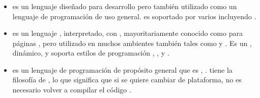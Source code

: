 	\subsubsection{\serverSideAS \scriptingLanguagePL}
		\begin{itemize}
			\item
				\textbf{\phpNAME} es un lenguaje \scripting \serverSideAS diseñado para desarrollo \webINT pero también utilizado como un lenguaje de programación de uso general\cite{online_technology_php}. \phpNAME es soportado por varios \webserverINT incluyendo \apacheNAME \httpNAME \serverAS.

			\item
				\textbf{\javaScriptNAME} es un lenguaje \lightweightPL, interpretado, \objectOrientedPL con \firstClassFuncPL, mayoritariamente conocido como \scriptingLanguagePL para páginas \webINT, pero utilizado en muchos ambientes \nonBrowserINT también tales como \nodejsNAME y \apacheNAME \couchdbNAME. Es un \scriptingLanguagePL \prototypeBasedPL, \multiParadigmPL dinámico, y soporta estilos de programación \objectOrientedPL, \imperativePL, y \functionalPL \cite{online_technology_mozilla_javascript}. 
			\item
				\textbf{\javaNAME} es un lenguaje de programación de propósito general que es \objectOrientedPL, \concurrentPL \classBasedPL \cite{online_technology_mozilla_javascript}. \javaNAME tiene la filosofía de \writeOnceRunAnyPL, lo que significa que si se quiere cambiar de plataforma, no es necesario volver a compilar el código \cite{online_java_write_once}.


\end{itemize}
